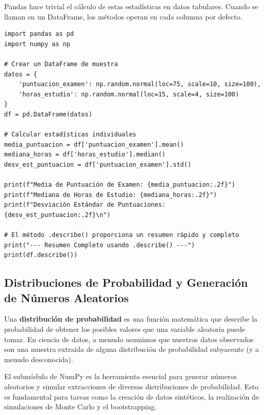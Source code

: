 \begin{example}
Pandas hace trivial el cálculo de estas estadísticas en datos tabulares. Cuando se llaman en un DataFrame, los métodos operan en cada columna por defecto.
\text{ }\begin{verbatim}
import pandas as pd
import numpy as np

# Crear un DataFrame de muestra
datos = {
    'puntuacion_examen': np.random.normal(loc=75, scale=10, size=100),
    'horas_estudio': np.random.normal(loc=15, scale=4, size=100)
}
df = pd.DataFrame(datos)

# Calcular estadísticas individuales
media_puntuacion = df['puntuacion_examen'].mean()
mediana_horas = df['horas_estudio'].median()
desv_est_puntuacion = df['puntuacion_examen'].std()

print(f"Media de Puntuación de Examen: {media_puntuacion:.2f}")
print(f"Mediana de Horas de Estudio: {mediana_horas:.2f}")
print(f"Desviación Estándar de Puntuaciones: {desv_est_puntuacion:.2f}\n")

# El método .describe() proporciona un resumen rápido y completo
print("--- Resumen Completo usando .describe() ---")
print(df.describe())
\end{verbatim}
\end{example}

\subsection{Distribuciones de Probabilidad y Generación de Números Aleatorios}
\label{subsec:distributions_rng}
Una \textbf{distribución de probabilidad} es una función matemática que describe la probabilidad de obtener los posibles valores que una variable aleatoria puede tomar. En ciencia de datos, a menudo asumimos que nuestros datos observados son una muestra extraída de alguna distribución de probabilidad subyacente (y a menudo desconocida).

El submódulo  de NumPy es la herramienta esencial para generar números aleatorios y simular extracciones de diversas distribuciones de probabilidad. Esto es fundamental para tareas como la creación de datos sintéticos, la realización de simulaciones de Monte Carlo y el bootstrapping.

